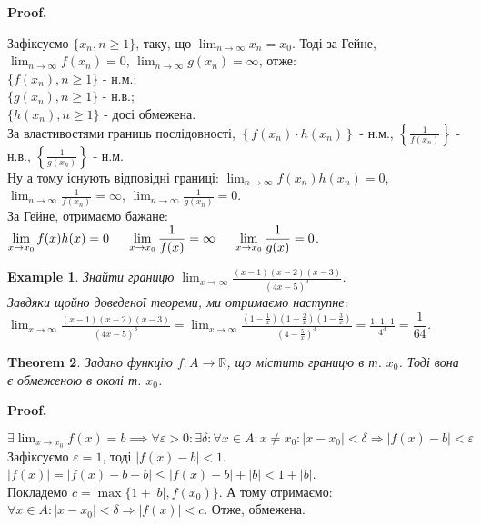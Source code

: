 \documentclass[a4paper, 14pt]{article}
\makeatletter
\def\huge{\displaystyle}
\def\qed{$\blacksquare$}
\theoremstyle{theoremdd}
\newtheorem{theorem}{Theorem}[subsection]
\theoremstyle{theoremdd}
\theoremstyle{theoremdd}
\theoremstyle{theoremdd}
\newtheorem{example}[theorem]{Example}
\theoremstyle{theoremdd}
\theoremstyle{theoremdd}
\theoremstyle{theoremdd}
\theoremstyle{theoremdd}
\renewenvironment{proof}[1][Proof.\\]{\par
\pushQED{\hfill \qed}%
\normalfont \topsep6\p@\@plus6\p@\relax
\trivlist
\item\relax
{\bfseries
#1\@addpunct{.}}\hspace\labelsep\ignorespaces
}{%
\popQED\endtrivlist\@endpefalse
}
\makeatother
\begin{document}
	\begin{proof}
	Зафіксуємо $\{x_n, n \geq 1\}$, таку, що $\huge \lim_{n \to \infty} x_n = x_0$. Тоді за Гейне, \\ 
	$\huge \lim_{n \to \infty} f(x_n) = 0$, $\huge \lim_{n \to \infty} g(x_n) = \infty$, отже:\\
	$\{f(x_n), n \geq 1\}$ - н.м.;\\
	$\{g(x_n), n \geq 1\}$ - н.в.;\\
	$\{h(x_n), n \geq 1\}$ - досі обмежена.\\
	За властивостями границь послідовності, $\left\{f(x_n) \cdot h(x_n) \right\}$ - н.м., $\left\{ \huge \frac{1}{f(x_n)} \right\}$ - н.в., $\left\{ \huge \frac{1}{g(x_n)} \right\}$ - н.м.\\
	Ну а тому існують відповідні границі: $\huge \lim_{n \to \infty} f(x_n) h(x_n) = 0$, $\huge \lim_{n \to \infty} \frac{1}{f(x_n)} = \infty$, $\huge \lim_{n \to \infty} \frac{1}{g(x_n)} = 0$.\\
	За Гейне, отримаємо бажане: $\huge\lim_{x \to x_0} f(x)h(x) = 0 \hspace{0.5cm} \huge\lim_{x \to x_0} \dfrac{1}{f(x)} = \infty \hspace{0.5cm} \huge\lim_{x \to x_0} \dfrac{1}{g(x)} = 0$.
	\end{proof}

	\begin{example}
	Знайти границю $\huge \lim_{x \to \infty} \frac{(x-1)(x-2)(x-3)}{(4x-5)^3}$.\\
	Завдяки щойно доведеної теореми, ми отримаємо наступне:\\
	$\huge \lim_{x \to \infty} \frac{(x-1)(x-2)(x-3)}{(4x-5)^3} = \lim_{x \to \infty} \frac{(1-\frac{1}{x})(1-\frac{2}{x})(1-\frac{3}{x})}{(4-\frac{5}{x})^3} = \frac{1 \cdot 1 \cdot 1}{4^3} = \dfrac{1}{64}$.
	\end{example}
	
	\begin{theorem} Задано функцію $f: A \to \mathbb{R}$, що містить границю в т. $x_0$. Тоді вона є обмеженою в околі т. $x_0$.
	\end{theorem}
	
	\begin{proof}
	$\exists \huge \lim_{x \to x_0} f(x) = b \implies \forall \varepsilon > 0: \exists \delta: \forall x \in A: x \neq x_0: |x-x_0|<\delta \Rightarrow |f(x)-b|<\varepsilon$\\
	Зафіксуємо $\varepsilon = 1$, тоді $|f(x) -b| < 1$.\\
	$|f(x)| = |f(x) - b + b| \leq |f(x) - b| + |b| < 1 + |b|$.\\
	Покладемо $c = \max\{1 + |b|, f(x_0) \}$. А тому отримаємо:\\
	$\forall x \in A: |x-x_0| < \delta \Rightarrow |f(x)| < c$. Отже, обмежена.
	\end{proof}
	
\end{document}
